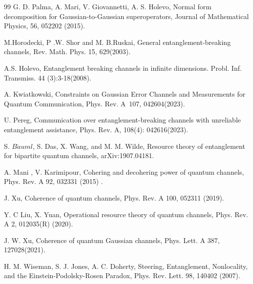 \documentclass[10pt,aps,pra,amsfonts,amssymb,amsmath,%
floatfix,nofootinbib, groupedaddress,superscriptaddress,citesort,twocolumn
]{revtex4}%
\begin{document}
\begin{thebibliography}{99}
 G. D. Palma, A. Mari, V. Giovannetti, A. S. Holevo,
\newblock Normal form decomposition for
Gaussian-to-Gaussian superoperators,
\newblock Journal of Mathematical Physics, 56, 052202 (2015).



 M.Horodecki,  P .W. Shor and  M. B.Ruskai,
	\newblock  General  entanglement-breaking channels,
	\newblock Rev. Math. Phys. 15, 629(2003).
	

	
		 A.S. Holevo,
		\newblock Entanglement breaking channels in infinite dimensions.
	\newblock	Probl. Inf. Transmiss. 44 (3):3-18(2008).
	
	
	
	A. Kwiatkowski,
	\newblock Constraints on Gaussian Error Channels and Measurements for Quantum Communication,
	\newblock Phys. Rev. A 107, 042604(2023). 
	
	
U. Pereg,
\newblock Communication over entanglement-breaking channels with unreliable entanglement assistance,
\newblock Phys. Rev. A, 108(4): 042616(2023).

  S. $B\ddot{a}uml$, S. Das, X. Wang, and M. M. Wilde,
\newblock  Resource theory of entanglement for bipartite quantum channels,
arXiv:1907.04181.



 A. Mani , V. Karimipour,
\newblock  Cohering and decohering power of quantum channels,
\newblock Phys. Rev. A 92, 032331 (2015) .



 J. Xu,
\newblock Coherence of quantum channels,
\newblock Phys. Rev. A 100, 052311 (2019).



 Y. C Liu, X. Yuan,
\newblock Operational resource theory of quantum channels,
\newblock Phys. Rev. A 2, 012035(R) (2020).






  J. W. Xu,
\newblock Coherence of quantum Gaussian channels,
\newblock Phys. Lett. A 387, 127028(2021).

  H. M. Wiseman, S. J. Jones,  A. C. Doherty,
\newblock Steering, Entanglement, Nonlocality, and the Einstein-Podolsky-Rosen Paradox,
\newblock Phys. Rev. Lett.  98, 140402 (2007).




\end{thebibliography}
\end{document}
